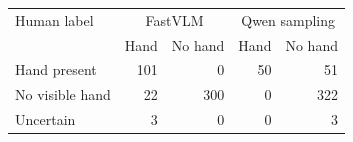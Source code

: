 \begin{tabularx}{\linewidth}{Xrrrr}
\toprule
Human label & \multicolumn{2}{c}{FastVLM} & \multicolumn{2}{c}{Qwen sampling}\\
 & Hand & No hand & Hand & No hand\\
\midrule
Hand present & 101 & 0 & 50 & 51\\
No visible hand & 22 & 300 & 0 & 322\\
Uncertain & 3 & 0 & 0 & 3\\
\bottomrule
\end{tabularx}
